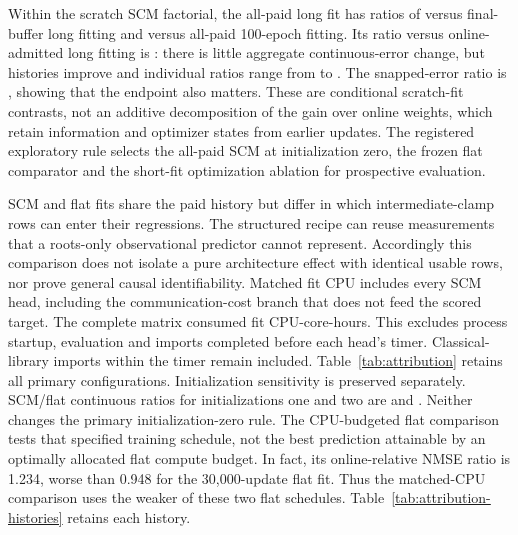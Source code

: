 Within the scratch SCM factorial, the all-paid long fit has ratios of
\ABufferRatio{} versus final-buffer long fitting and \AOptimizationRatio{}
versus all-paid 100-epoch fitting. Its ratio versus online-admitted long
fitting is \AUnusedRatio{}: there is little aggregate continuous-error change,
but \AUnusedWins{} histories improve and individual ratios range from
\AUnusedMin{} to \AUnusedMax{}. The snapped-error ratio is
\AUnusedSnappedRatio{}, showing that the endpoint also matters.
These are conditional scratch-fit contrasts, not an additive decomposition of
the gain over online weights, which retain information and optimizer states from
earlier updates. The registered exploratory rule selects the all-paid
SCM at initialization zero, the frozen flat comparator and the short-fit
optimization ablation for prospective evaluation.

SCM and flat fits share the paid history but differ in which intermediate-clamp
rows can enter their regressions. The structured recipe can reuse measurements
that a roots-only observational predictor cannot represent. Accordingly this
comparison does not isolate a pure architecture effect with identical usable
rows, nor prove general causal identifiability. Matched fit CPU includes every
SCM head, including the communication-cost branch that does not feed the scored
target. The complete matrix consumed \AFitCPU{} fit CPU-core-hours. This excludes
process startup, evaluation and imports completed before each head's timer.
Classical-library imports within the timer remain included. Table~\ref{tab:attribution} retains all
primary configurations. Initialization sensitivity is preserved separately.
SCM/flat continuous ratios for initializations one and two are
\AFlatInitOneRatio{} and \AFlatInitTwoRatio{}. Neither changes the primary
initialization-zero rule. The CPU-budgeted flat comparison tests that specified
training schedule, not the best prediction attainable by an optimally allocated
flat compute budget. In fact, its online-relative NMSE ratio is 1.234, worse
than 0.948 for the 30,000-update flat fit. Thus the matched-CPU comparison uses
the weaker of these two flat schedules. Table~\ref{tab:attribution-histories} retains each history.

